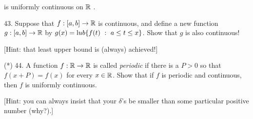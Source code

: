 \documentclass[12pt]{article}
\begin{document}
\begin{description}
\ssk

\item{\spc} is uniformly continuous on ${\mathbb R}$ .

\msk

\item{43.} Suppose that $f:[a,b]\rightarrow{\mathbb R}$ is continuous, and define a new function $g:[a,b]\rightarrow{\mathbb R}$ by
$g(x)={\textrm lub}\{f(t)\ :\ a\leq t\leq x\}$. Show that $g$ is also continuous!

\ssk

\item{\spc} [Hint: that least upper bound is (always) achieved!]

\msk

\item{(*) 44.} A function $f:{\mathbb R}\rightarrow{\mathbb R}$ is called {\it periodic} if there is a $P>0$ so that $f(x+P)=f(x)$ for every $x\in{\mathbb R}$.
Show that if $f$ is periodic and continuous, then $f$ is uniformly continuous. 

\ssk

\item{\spc} [Hint: you can always insist that your $\delta$'s be smaller than some particular positive number (why?).]

\msk


\end{description}
\vfill
\end{document}
